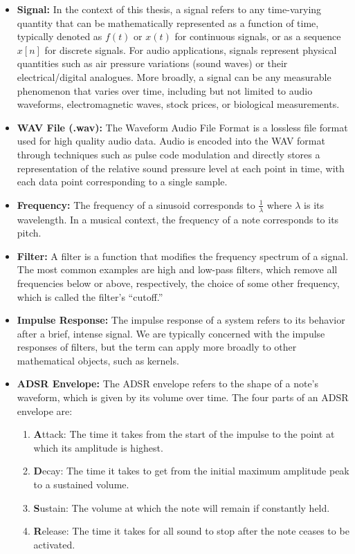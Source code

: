 \documentclass[11pt,twoside]{report}
\numberwithin{thm}{section}
\numberwithin{equation}{section}
\begin{document}
\begin{itemize}

    \item \textbf{Signal:} In the context of this thesis, a signal refers to any time-varying quantity that can be mathematically represented as a function of time, typically denoted as $f(t)$ or $x(t)$ for continuous signals, or as a sequence $x[n]$ for discrete signals. For audio applications, signals represent physical quantities such as air pressure variations (sound waves) or their electrical/digital analogues. More broadly, a signal can be any measurable phenomenon that varies over time, including but not limited to audio waveforms, electromagnetic waves, stock prices, or biological measurements.

    \item \textbf{WAV File (.wav): }The Waveform Audio File Format is a lossless file format used for high quality audio data. Audio is encoded into the WAV format through techniques such as pulse code modulation and directly stores a representation of the relative sound pressure level at each point in time, with each data point corresponding to a single sample. 

    \item \textbf{Frequency: }The frequency of a sinusoid corresponds to $\frac{1}{\lambda}$ where $\lambda$ is its wavelength. In a musical context, the frequency of a note corresponds to its pitch. 

    \item \textbf{Filter: }A filter is a function that modifies the frequency spectrum of a signal. The most common examples are high and low-pass filters, which remove all frequencies below or above, respectively, the choice of some other frequency, which is called the filter's ``cutoff.'' 

    \item \textbf{Impulse Response: }The impulse response of a system refers to its behavior after a brief, intense signal. We are typically concerned with the impulse responses of filters, but the term can apply more broadly to other mathematical objects, such as kernels. 

    \item \textbf{ADSR Envelope: }The ADSR envelope refers to the shape of a note's waveform, which is given by its volume over time. The four parts of an ADSR envelope are:
    \begin{enumerate}
        \item \textbf{A}ttack: The time it takes from the start of the impulse to the point at which its amplitude is highest. 
        \item \textbf{D}ecay: The time it takes to get from the initial maximum amplitude peak to a sustained volume.
        \item \textbf{S}ustain: The volume at which the note will remain if constantly held. 
        \item \textbf{R}elease: The time it takes for all sound to stop after the note ceases to be activated. 
    \end{enumerate}


\end{itemize}
\end{document}
